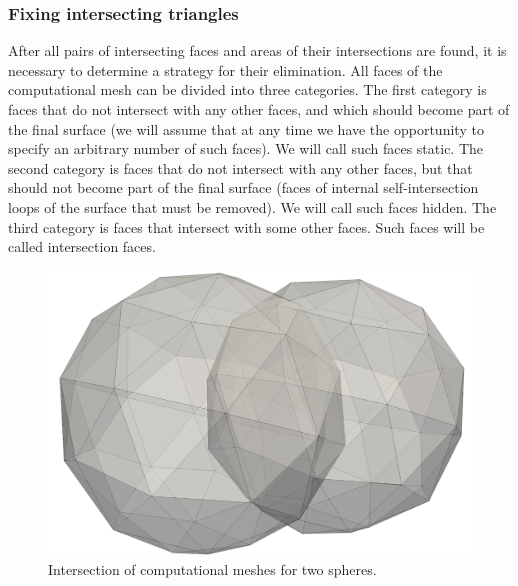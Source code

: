 \subsubsection{Fixing intersecting triangles}

After all pairs of intersecting faces and areas of their intersections are found, it is necessary to determine a strategy for their elimination.
All faces of the computational mesh can be divided into three categories.
The first category is faces that do not intersect with any other faces, and which should become part of the final surface (we will assume that at any time we have the opportunity to specify an arbitrary number of such faces).
We will call such faces static.
The second category is faces that do not intersect with any other faces, but that should not become part of the final surface (faces of internal self-intersection loops of the surface that must be removed).
We will call such faces hidden.
The third category is faces that intersect with some other faces.
Such faces will be called intersection faces.

\begin{figure}[h]
\centering
\includegraphics[width=\textwidth]{pics/text_1_int/pic_zip_01.png}
\caption{Intersection of computational meshes for two spheres.}\label{fig:pic_zip_01}
\end{figure}


